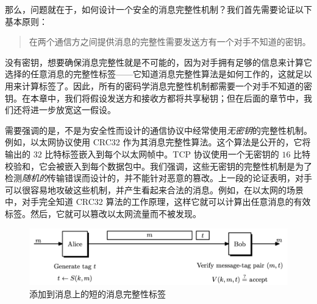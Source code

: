 那么，问题就在于，如何设计一个安全的消息完整性机制？我们首先需要论证以下基本原则：
\begin{quote}
在两个通信方之间提供消息的完整性需要发送方有一个对手不知道的密钥。
\end{quote}
没有密钥，想要确保消息完整性就是不可能的，因为对手拥有足够的信息来计算它选择的任意消息的完整性标签——它知道消息完整性算法是如何工作的，这就足以用来计算标签了。因此，所有的密码学消息完整性机制都需要一个对手不知道的密钥。在本章中，我们将假设发送方和接收方都将共享秘钥；但在后面的章节中，我们还将进一步放宽这一假设。

需要强调的是，不是为安全性而设计的通信协议中经常使用\emph{无密钥}的完整性机制。例如，以太网协议使用 CRC32 作为其消息完整性算法。这个算法是公开的，它将输出的 $32$ 比特标签嵌入到每个以太网帧中。TCP 协议使用一个无密钥的 $16$ 比特校验和，它会被嵌入到每个数据包中。我们强调，这些无密钥的完整性机制是为了检测\emph{随机的}传输错误而设计的，并不能针对恶意的篡改。上一段的论证表明，对手可以很容易地攻破这些机制，并产生看起来合法的消息。例如，在以太网的场景中，对手完全知道 CRC32 算法的工作原理，这样它就可以计算出任意消息的有效标签。然后，它就可以篡改以太网流量而不被发现。

\begin{figure}
  \centering
  \includegraphics[width=0.75\linewidth]{figures/chapter6/fig1.png}
  \caption{添加到消息上的短的消息完整性标签}
  \label{fig:6-1}
\end{figure}














